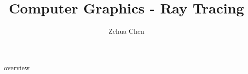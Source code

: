 \documentclass[letterpaper, 11pt]{report}
\title{Computer Graphics - Ray Tracing}
\author{Zehua Chen}
\begin{document}
  \maketitle
  \tableofcontents

  {overview}
\end{document}
